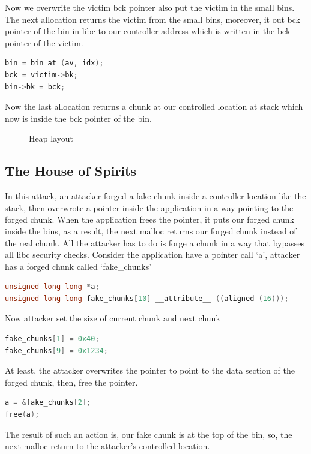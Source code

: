 \documentclass{masterthesis}
\newcommand*\sbs{small bins}
\begin{document}
Now we overwrite the victim bck pointer also put the victim in the \sbs{}. The next allocation returns the victim from the \sbs{}, moreover, it out bck pointer of the bin in libc to our controller address which is written in the bck pointer of the victim.

\begin{lstlisting}[language=c,frame=tlrb]
bin = bin_at (av, idx);
bck = victim->bk;
bin->bk = bck;
\end{lstlisting}

Now the last allocation returns a chunk at our controlled location at stack which now is inside the bck pointer of the bin. 

\begin{figure}[h!]
  \caption{Heap layout}
\end{figure}

\subsection{The House of Spirits}
In this attack, an attacker forged a fake chunk inside a controller location like the stack, then overwrote a pointer inside the application in a way pointing to the forged chunk. When the application frees the pointer, it puts our forged chunk inside the bins, as a result, the next malloc returns our forged chunk instead of the real chunk. All the attacker has to do is forge a chunk in a way that bypasses all libc security checks. Consider the application have a pointer call ‘a’, attacker has a forged chunk called ‘fake\_chunks’
\begin{lstlisting}[language=c,frame=tlrb]
unsigned long long *a;
unsigned long long fake_chunks[10] __attribute__ ((aligned (16)));
\end{lstlisting}
Now attacker set the size of current chunk and next chunk
\begin{lstlisting}[language=c,frame=tlrb]
fake_chunks[1] = 0x40;
fake_chunks[9] = 0x1234;
\end{lstlisting}
At least, the attacker overwrites the pointer to point to the data section of the forged chunk, then, free the pointer.
\begin{lstlisting}[language=c,frame=tlrb]
a = &fake_chunks[2];
free(a);
\end{lstlisting}
The result of such an action is, our fake chunk is at the top of the bin, so, the next malloc return to the attacker's controlled location.
\end{document}
